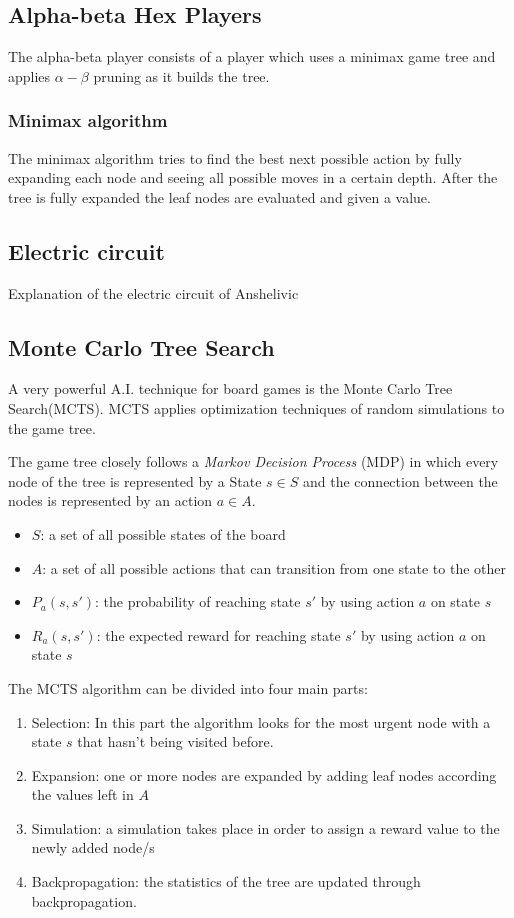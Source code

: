 \documentclass{ba-kecs}
\begin{document}
\subsection{Alpha-beta Hex Players}
The alpha-beta player consists of a player which uses a minimax game tree and applies $\alpha - \beta$ pruning as it builds the tree.
\subsubsection{Minimax algorithm}
The minimax algorithm tries to find the best next possible action by fully expanding each node and seeing all possible moves in a certain depth. After the tree is fully expanded the leaf nodes are evaluated and given a value. 

\subsection{Electric circuit}
Explanation of the electric circuit of Anshelivic

\subsection{Monte Carlo Tree Search}
A very powerful A.I. technique for board games is the Monte Carlo Tree Search(MCTS). MCTS applies optimization techniques of random simulations to the game tree. 

The game tree closely follows a \textit{Markov Decision Process} (MDP) in which every node of the tree is represented by a State $s \in S$ and the connection between the nodes is represented by an action $a \in A$.
\begin{itemize}
\item $S$: a set of all possible states of the board
\item $A$: a set of all possible actions that can transition from one state to the other
\item $P_a(s, s')$: the probability of reaching state $s'$ by using action $a$ on state $s$
\item $R_a(s, s')$: the expected reward for reaching state $s'$ by using action $a$ on state $s$
\end{itemize}

The MCTS algorithm can be divided into four main parts: 
\begin{enumerate}
\item Selection: In this part the algorithm looks for the most urgent node with a state $s$ that hasn't being visited before.
\item Expansion: one or more nodes are expanded by adding leaf nodes according the values left in $A$
\item Simulation: a simulation takes place in order to assign a reward value to the newly added node/s
\item Backpropagation: the statistics of the tree are updated through backpropagation.
\end{enumerate}
\end{document}
